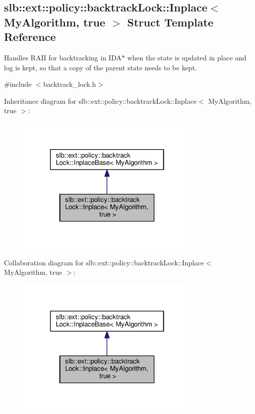 \hypertarget{structslb_1_1ext_1_1policy_1_1backtrackLock_1_1Inplace_3_01MyAlgorithm_00_01true_01_4}{}\subsection{slb\+:\+:ext\+:\+:policy\+:\+:backtrack\+Lock\+:\+:Inplace$<$ My\+Algorithm, true $>$ Struct Template Reference}
\label{structslb_1_1ext_1_1policy_1_1backtrackLock_1_1Inplace_3_01MyAlgorithm_00_01true_01_4}


Handles R\+A\+II for backtracking in I\+D\+A$\ast$ when the state is updated in place and log is kept, so that a copy of the parent state needs to be kept.  




{\ttfamily \#include $<$backtrack\+\_\+lock.\+h$>$}



Inheritance diagram for slb\+:\+:ext\+:\+:policy\+:\+:backtrack\+Lock\+:\+:Inplace$<$ My\+Algorithm, true $>$\+:\nopagebreak
\begin{figure}[H]
\begin{center}
\leavevmode
\includegraphics[width=250pt]{structslb_1_1ext_1_1policy_1_1backtrackLock_1_1Inplace_3_01MyAlgorithm_00_01true_01_4__inherit__graph}
\end{center}
\end{figure}


Collaboration diagram for slb\+:\+:ext\+:\+:policy\+:\+:backtrack\+Lock\+:\+:Inplace$<$ My\+Algorithm, true $>$\+:\nopagebreak
\begin{figure}[H]
\begin{center}
\leavevmode
\includegraphics[width=250pt]{structslb_1_1ext_1_1policy_1_1backtrackLock_1_1Inplace_3_01MyAlgorithm_00_01true_01_4__coll__graph}
\end{center}
\end{figure}
